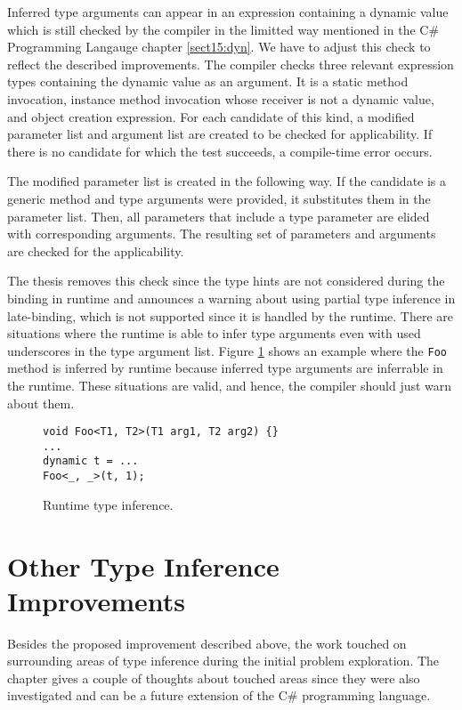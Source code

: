 Inferred type arguments can appear in an expression containing a dynamic value which is still checked by the compiler in the limitted way mentioned in the C\# Programming Langauge chapter \ref{sect15:dyn}.
We have to adjust this check to reflect the described improvements.
The compiler checks three relevant expression types containing the dynamic value as an argument. 
It is a static method invocation, instance method invocation whose receiver is not a dynamic value, and object creation expression. 
For each candidate of this kind, a modified parameter list and argument list are created to be checked for applicability. 
If there is no candidate for which the test succeeds, a compile-time error occurs.
\par
The modified parameter list is created in the following way. 
If the candidate is a generic method and type arguments were provided, it substitutes them in the parameter list. 
Then, all parameters that include a type parameter are elided with corresponding arguments. 
The resulting set of parameters and arguments are checked for the applicability.
\par
The thesis removes this check since the type hints are not considered during the binding in runtime and announces a warning about using partial type inference in late-binding, which is not supported since it is handled by the runtime. 
There are situations where the runtime is able to infer type arguments even with used underscores in the type argument list. 
Figure \ref{img63:dinamic} shows an example where the \texttt{Foo} method is inferred by runtime because inferred type arguments are inferrable in the runtime. 
These situations are valid, and hence, the compiler should just warn about them.
\begin{figure}[h!]
\begin{lstlisting}[style=csharp, mathescape=true]
void Foo<T1, T2>(T1 arg1, T2 arg2) {}
...
dynamic t = ...
Foo<_, _>(t, 1);
\end{lstlisting}
\caption{Runtime type inference.}
\label{img63:dinamic}
\end{figure}

\section{Other Type Inference Improvements}

Besides the proposed improvement described above, the work touched on surrounding areas of type inference during the initial problem exploration. 
The chapter gives a couple of thoughts about touched areas since they were also investigated and can be a future extension of the C\# programming language.

